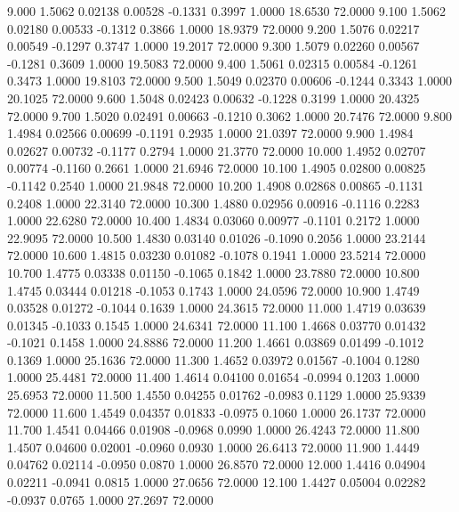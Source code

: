    9.000   1.5062   0.02138   0.00528  -0.1331   0.3997   1.0000  18.6530  72.0000
   9.100   1.5062   0.02180   0.00533  -0.1312   0.3866   1.0000  18.9379  72.0000
   9.200   1.5076   0.02217   0.00549  -0.1297   0.3747   1.0000  19.2017  72.0000
   9.300   1.5079   0.02260   0.00567  -0.1281   0.3609   1.0000  19.5083  72.0000
   9.400   1.5061   0.02315   0.00584  -0.1261   0.3473   1.0000  19.8103  72.0000
   9.500   1.5049   0.02370   0.00606  -0.1244   0.3343   1.0000  20.1025  72.0000
   9.600   1.5048   0.02423   0.00632  -0.1228   0.3199   1.0000  20.4325  72.0000
   9.700   1.5020   0.02491   0.00663  -0.1210   0.3062   1.0000  20.7476  72.0000
   9.800   1.4984   0.02566   0.00699  -0.1191   0.2935   1.0000  21.0397  72.0000
   9.900   1.4984   0.02627   0.00732  -0.1177   0.2794   1.0000  21.3770  72.0000
  10.000   1.4952   0.02707   0.00774  -0.1160   0.2661   1.0000  21.6946  72.0000
  10.100   1.4905   0.02800   0.00825  -0.1142   0.2540   1.0000  21.9848  72.0000
  10.200   1.4908   0.02868   0.00865  -0.1131   0.2408   1.0000  22.3140  72.0000
  10.300   1.4880   0.02956   0.00916  -0.1116   0.2283   1.0000  22.6280  72.0000
  10.400   1.4834   0.03060   0.00977  -0.1101   0.2172   1.0000  22.9095  72.0000
  10.500   1.4830   0.03140   0.01026  -0.1090   0.2056   1.0000  23.2144  72.0000
  10.600   1.4815   0.03230   0.01082  -0.1078   0.1941   1.0000  23.5214  72.0000
  10.700   1.4775   0.03338   0.01150  -0.1065   0.1842   1.0000  23.7880  72.0000
  10.800   1.4745   0.03444   0.01218  -0.1053   0.1743   1.0000  24.0596  72.0000
  10.900   1.4749   0.03528   0.01272  -0.1044   0.1639   1.0000  24.3615  72.0000
  11.000   1.4719   0.03639   0.01345  -0.1033   0.1545   1.0000  24.6341  72.0000
  11.100   1.4668   0.03770   0.01432  -0.1021   0.1458   1.0000  24.8886  72.0000
  11.200   1.4661   0.03869   0.01499  -0.1012   0.1369   1.0000  25.1636  72.0000
  11.300   1.4652   0.03972   0.01567  -0.1004   0.1280   1.0000  25.4481  72.0000
  11.400   1.4614   0.04100   0.01654  -0.0994   0.1203   1.0000  25.6953  72.0000
  11.500   1.4550   0.04255   0.01762  -0.0983   0.1129   1.0000  25.9339  72.0000
  11.600   1.4549   0.04357   0.01833  -0.0975   0.1060   1.0000  26.1737  72.0000
  11.700   1.4541   0.04466   0.01908  -0.0968   0.0990   1.0000  26.4243  72.0000
  11.800   1.4507   0.04600   0.02001  -0.0960   0.0930   1.0000  26.6413  72.0000
  11.900   1.4449   0.04762   0.02114  -0.0950   0.0870   1.0000  26.8570  72.0000
  12.000   1.4416   0.04904   0.02211  -0.0941   0.0815   1.0000  27.0656  72.0000
  12.100   1.4427   0.05004   0.02282  -0.0937   0.0765   1.0000  27.2697  72.0000
